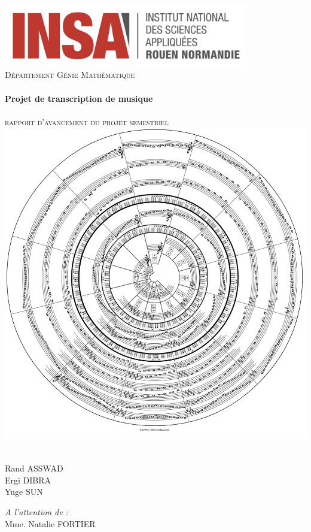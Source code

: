 \begin{titlepage}
  \begin{sffamily}
  \begin{center}
	\includegraphics[width=0.8\textwidth]{img/INSA_logo}\\[2cm]

    \textsc{\huge Département Génie Mathématique}\\[0.7cm]

    \HRule \\[0.4cm]
    {\huge \bfseries Projet de transcription de musique \\[0.4cm]}
    \HRule \\[1cm]
	\textsc{\huge rapport d'avancement du projet semestriel}\\[0.7cm]

    \includegraphics[width=.6\textwidth]{img/cover_img.png}~\\[1cm]

    \begin{minipage}{0.4\textwidth}
		\Large\raggedright
        Rand ASSWAD\\
		Ergi DIBRA\\
		Yuge SUN
    \end{minipage}
    \begin{minipage}{0.4\textwidth}
		\Large\raggedleft
		\emph{A l'attention de :}\\
		Mme. Natalie FORTIER
    \end{minipage}

	\vfill
  \end{center}
  \end{sffamily}
\end{titlepage}

